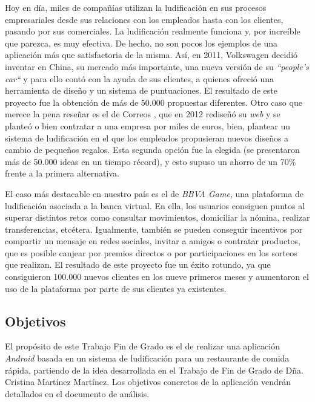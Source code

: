 \documentclass[twoside]{report}
\begin{document}
Hoy en día, miles de compañías utilizan la ludificación en sus procesos empresariales desde sus relaciones con los empleados hasta con los clientes, pasando por sus comerciales. La ludificación realmente funciona y, por increíble que parezca, es muy efectiva. De hecho, no son pocos los ejemplos de una aplicación más que satisfactoria de la misma. Así, en 2011, \cite{accentureGami} Volkswagen decidió inventar en China, su mercado más importante, una nueva versión de su \textit{“people’s car“} y para ello contó con la ayuda de sus clientes, a quienes ofreció una herramienta de diseño y un sistema de puntuaciones. El resultado de este proyecto fue la obtención de más de 50.000 propuestas diferentes. Otro caso que merece la pena reseñar es el de Correos \cite{confidencialcorreosgami}, que en 2012 rediseñó su \textit{web} y se planteó o bien contratar a una empresa por miles de euros, bien, plantear un sistema de ludificación en el que los empleados propusieran nuevos diseños a cambio de pequeños regalos. Esta segunda opción fue la elegida (se presentaron más de 50.000 ideas en un tiempo récord), y esto supuso un ahorro de un 70\% frente a la primera alternativa. 

El caso más destacable en nuestro país es el de \cite{bbvag} \textit{BBVA Game}, una plataforma de ludificación asociada a la banca virtual. En ella, los usuarios consiguen puntos al superar distintos retos como consultar movimientos, domiciliar la nómina, realizar transferencias, etcétera. Igualmente, también se pueden conseguir incentivos por compartir un mensaje en redes sociales,  invitar a amigos o contratar productos, que es posible canjear por premios directos o por participaciones en los sorteos que realizan. El resultado de este proyecto fue un éxito rotundo, ya que consiguieron 100.000 nuevos clientes en los nueve primeros meses y aumentaron el uso de la plataforma por parte de sus clientes ya existentes.

\subsection{Objetivos}

El propósito de este Trabajo Fin de Grado es el de realizar una aplicación \textit{Android} basada en un sistema de ludificación para un restaurante de comida rápida, partiendo de la idea desarrollada en el \cite{cristinatfg} Trabajo de Fin de Grado de Dña. Cristina Martínez Martínez. Los objetivos concretos de la aplicación vendrán detallados en el documento de análisis.
\end{document}

